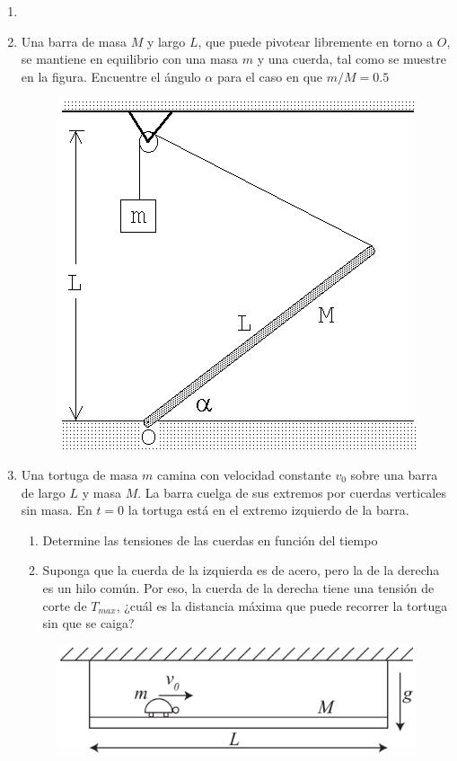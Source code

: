 \documentclass[letterpaper,11pt]{article}
\begin{document}
\vspace{-1cm}
\begin{enumerate}\setlength{\itemsep}{0.4cm}


\item[]

\item

Una barra de masa $M$ y largo $L$, que puede pivotear libremente en torno a $O$, se mantiene en equilibrio con una masa $m$ y una cuerda, tal como se muestre en la figura. Encuentre el ángulo $\alpha$ para el caso en que $m/M=0.5$

\begin{figure}[H]
    \centering
    \includegraphics[width=0.25\linewidth]{2021-2/img/aux12/aux12-barra-polea.png}
\end{figure}

\item Una tortuga de masa $m$ camina con velocidad constante $v_0$ sobre una barra de largo $L$ y masa $M$. La barra cuelga de sus extremos por cuerdas verticales sin masa. En $t=0$ la tortuga está en el extremo izquierdo de la barra.
    \begin{enumerate}
        \item Determine las tensiones de las cuerdas en función del tiempo
        
        \item Suponga que la cuerda de la izquierda es de acero, pero la de la derecha es un hilo común. Por eso, la cuerda de la derecha tiene una tensión de corte de $T_{max}$, ¿cuál es la distancia máxima que puede recorrer la tortuga sin que se caiga?
    \end{enumerate}
    
\begin{figure}[H]
    \centering
    \includegraphics[width=0.45\linewidth]{2021-2/img/aux12/aux12-tortuga.PNG}
\end{figure}


\end{enumerate}
\end{document}
